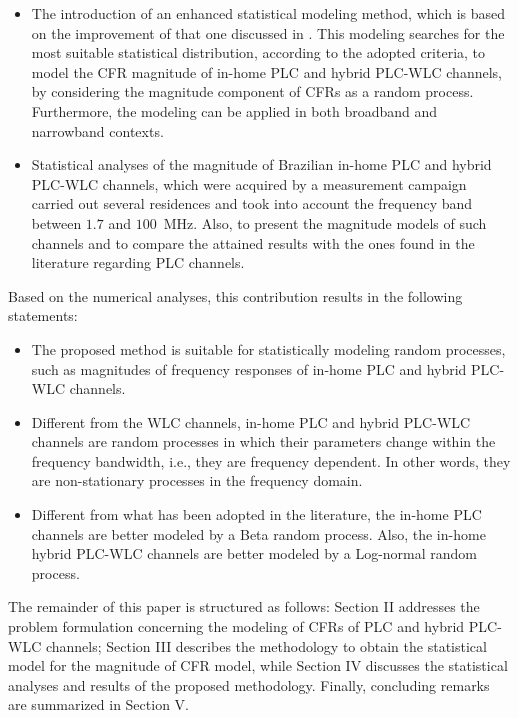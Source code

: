 \documentclass[journal]{IEEEtran}
\begin{document}
\begin{itemize}
	\item The introduction of an enhanced statistical modeling method, which is based on the improvement of that one discussed in \cite{Luis:AI,Luis:doc}. This modeling searches for the most suitable statistical distribution, according to the adopted criteria, to model the \ac{CFR} magnitude of in-home \ac{PLC} and hybrid \ac{PLC}-\ac{WLC} channels, by considering the magnitude component of \acp{CFR} as a random process. Furthermore, the modeling can be applied in both broadband and narrowband contexts.
	
	\item Statistical analyses of the magnitude of Brazilian in-home \ac{PLC} and hybrid \ac{PLC}-\ac{WLC} channels, which were acquired by a measurement campaign carried out several residences and took into account the frequency band between $1.7$ and $100$~MHz. Also, to present the magnitude models of such channels and to compare the attained results with the ones found in the literature regarding \ac{PLC} channels. 
\end{itemize}

Based on the numerical analyses, this contribution results in the following statements:
\begin{itemize}
    \item The proposed method is suitable for statistically modeling random processes, such as magnitudes of frequency responses of in-home \ac{PLC} and hybrid \ac{PLC}-\ac{WLC} channels.
    \item Different from the \ac{WLC} channels, in-home \ac{PLC} and hybrid \ac{PLC}-\ac{WLC} channels are random processes in which their parameters change within the frequency bandwidth, i.e., they are frequency dependent. In other words, they are non-stationary processes in the frequency domain. 
    \item Different from what has been adopted in the literature, the in-home \ac{PLC} channels are better modeled by a Beta random process. Also, the in-home hybrid \ac{PLC}-\ac{WLC} channels are better modeled by a Log-normal random process. 
\end{itemize}

The remainder of this paper is structured as follows: Section II addresses the problem formulation concerning the modeling of \acp{CFR} of \ac{PLC} and hybrid \ac{PLC}-\ac{WLC} channels; Section III describes the methodology to obtain the statistical model for the magnitude of \ac{CFR} model, while Section IV discusses the statistical analyses and results of the proposed methodology. Finally, concluding remarks are summarized in Section V.
\end{document}
